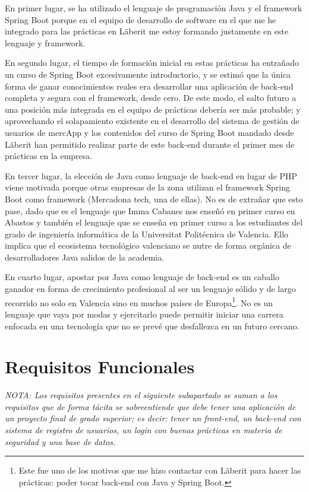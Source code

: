 \documentclass[a4paper,12pt]{report}
\begin{document}
		En primer lugar, se ha utilizado el lenguaje de programación Java y el framework Spring Boot porque en el equipo de desarrollo de software en el que me he integrado para las prácticas en Lãberit me estoy formando justamente en este lenguaje y framework. 
		
		En segundo lugar, el tiempo de formación inicial en estas prácticas ha entrañado un curso de Spring Boot excesivamente introductorio, y se estimó que la única forma de ganar conocimientos reales era desarrollar una aplicación de back-end completa y segura con el framework, desde cero. De este modo, el salto futuro a una posición más integrada en el equipo de prácticas debería ser más probable; y aprovechando el solapamiento existente en el desarrollo del sistema de gestión de usuarios de mercApp y los contenidos del curso de Spring Boot mandado desde Lãberit han permitido realizar parte de este back-end durante el primer mes de prácticas en la empresa.
			
		En tercer lugar, la elección de Java como lenguaje de back-end en lugar de PHP viene motivada porque otras empresas de la zona utilizan el framework Spring Boot como framework (Mercadona tech, una de ellas). No es de extrañar que esto pase, dado que es el lenguaje que Imma Cabanes nos enseñó en primer curso en Abastos y también el lenguaje que se enseña en primer curso a los estudiantes del grado de ingeniería informática de la Universitat Politécnica de Valencia. Ello implica que el ecosistema tecnológico valenciano se nutre de forma orgánica de desarrolladores Java salidos de la academia.
		
		En cuarto lugar, apostar por Java como lenguaje de back-end es un caballo ganador en forma de crecimiento profesional al ser un lenguaje sólido y de largo recorrido no solo en Valencia sino en muchos países de Europa\footnote{Este fue uno de los motivos que me hizo contactar con Lãberit para hacer las prácticas: poder tocar back-end con Java y Spring Boot.}. No es un lenguaje que vaya por modas y ejercitarlo puede permitir iniciar una carrera enfocada en una tecnología que no se prevé que desfallezca en un futuro cercano.
		

		
		
		\section{Requisitos Funcionales}
		
			\textit{NOTA: Los requisitos presentes en el siguiente subapartado se suman a los requisitos que de forma tácita se sobreentiende que debe tener una aplicación de un proyecto final de grado superior; es decir: tener un front-end, un back-end con sistema de registro de usuarios, un login con buenas prácticas en materia de seguridad y una base de datos.}
		
\end{document}
